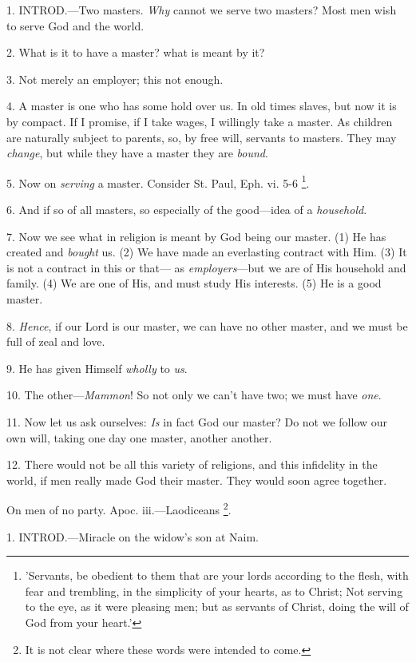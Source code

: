 1. INTROD.—Two
masters. \emph{Why} cannot we serve two masters? Most men wish to
serve God and the world.

2. What is it to have a master? what is meant by
it?

3. Not merely an employer; this not enough.

4. A master is one who has some hold over us. In
old times slaves, but now it is by compact. If I promise, if I take
wages, I willingly take a master. As children are naturally subject to
parents, so, by free will, servants to masters. They may \emph{change},
but while they have a master they are \emph{bound}.

5. Now on \emph{serving} a master. Consider St.
Paul, Eph. vi. 5-6 \footnote{'Servants, be obedient
to them that are your lords according to the flesh, with fear and
trembling, in the simplicity of your hearts, as to Christ; Not serving
to the eye, as it were pleasing men; but as servants of Christ, doing
the will of God from your heart.'}.

6. And if so of all masters, so especially of the
good—idea of a \emph{household}.

7. Now we see what in religion is meant by God
being our master. (1) He has created and \emph{bought} us. (2) We have
made an everlasting contract with Him. (3) It is not a contract in
this or that— as \emph{employers}—but we are of His household and
family. (4) We are one of His, and must study His interests. (5) He is
a good master.

8. \emph{Hence}, if our Lord is our master, we
can have no other master, and we must be full of zeal and love.

9. He has given Himself \emph{wholly} to \emph{us}.

10. The other—\emph{Mammon}! So not only we can't
have two; we must have \emph{one}.

11. Now let us ask ourselves: \emph{Is} in fact
God our master? Do not we follow our own will, taking one day one
master, another another.

12. There would not be all this variety of
religions, and this infidelity in the world, if men really made God
their master. They would soon agree together.

On men of no party. Apoc. iii.—Laodiceans \footnote{It is not clear where
these words were intended to come.}.


1. INTROD.—Miracle
on the widow's son at Naim.

